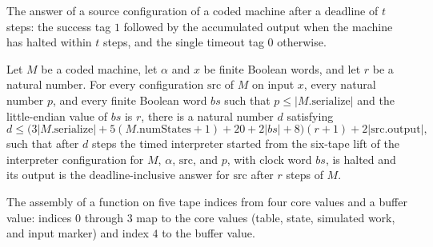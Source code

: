 \begin{definition}
\label{Turing.timedAnswer}
\leanok
{}
The answer of a source configuration of a coded machine after a deadline of
$t$ steps: the success tag $1$ followed by the accumulated output when the
machine has halted within $t$ steps, and the single timeout tag $0$ otherwise.
\end{definition}

\begin{lemma}
\label{Turing.timed_interpret_finishes}
\leanok
{}
Let $M$ be a coded machine, let $\alpha$ and $x$ be finite Boolean words, and let $r$ be
a natural number. For every configuration $\mathrm{src}$ of $M$ on input $x$, every
natural number $p$, and every finite Boolean word $bs$ such that $p\leq
|M.\mathrm{serialize}|$ and the little-endian value of $bs$ is $r$, there is a natural
number $d$ satisfying
\[
d\leq
\bigl(3|M.\mathrm{serialize}|+5(M.\mathrm{numStates}+1)+20+2|bs|+8\bigr)(r+1)+2|\mathrm{src.output}|,
\]
such that after $d$ steps the timed interpreter started from the six-tape lift of the
interpreter configuration for $M$, $\alpha$, $\mathrm{src}$, and $p$, with clock word
$bs$, is halted and its output is the deadline-inclusive answer for $\mathrm{src}$ after
$r$ steps of $M$.
\end{lemma}

\begin{definition}
\label{Turing.timedFive}
\leanok
The assembly of a function on five tape indices from four core values and a
buffer value: indices $0$ through $3$ map to the core values (table, state,
simulated work, and input marker) and index $4$ to the buffer value.
\end{definition}

